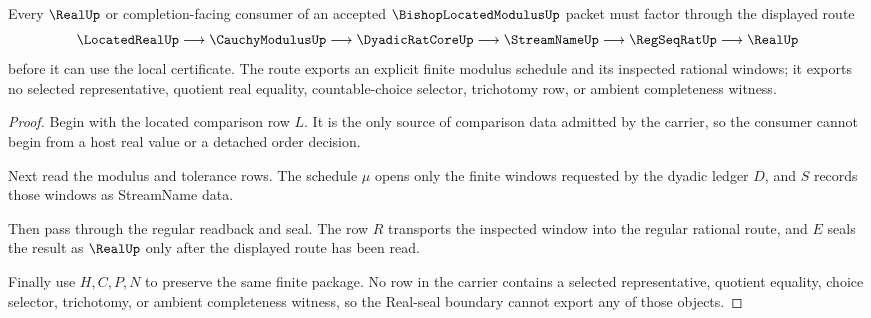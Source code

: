 \begin{theorem}
\label{thm:bishop-located-modulus-real-seal-boundary}
Every $\RealUp$ or completion-facing consumer of an accepted $\BishopLocatedModulusUp$ packet must factor through the displayed route
$$
\LocatedRealUp \longrightarrow \CauchyModulusUp \longrightarrow \DyadicRatCoreUp \longrightarrow \StreamNameUp \longrightarrow \RegSeqRatUp \longrightarrow \RealUp
$$
before it can use the local certificate. The route exports an explicit finite modulus schedule and its inspected rational windows; it exports no selected representative, quotient real equality, countable-choice selector, trichotomy row, or ambient completeness witness.
\end{theorem}
\begin{proof}
Begin with the located comparison row $L$. It is the only source of comparison data admitted by the carrier, so the consumer cannot begin from a host real value or a detached order decision.

Next read the modulus and tolerance rows. The schedule $\mu$ opens only the finite windows requested by the dyadic ledger $D$, and $S$ records those windows as StreamName data.

Then pass through the regular readback and seal. The row $R$ transports the inspected window into the regular rational route, and $E$ seals the result as $\RealUp$ only after the displayed route has been read.

Finally use $H,C,P,N$ to preserve the same finite package. No row in the carrier contains a selected representative, quotient equality, choice selector, trichotomy, or ambient completeness witness, so the Real-seal boundary cannot export any of those objects.
\end{proof}



